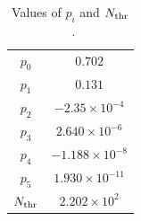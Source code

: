 \begin{table}[H]
	\centering
	\caption[Values of $p_{i}$ and $N_{\rm thr}$]{
	Values of $p_{i}$ and $N_{\rm thr}$~\cite{2023HaradaPhD}.
	}\label{tab:Recons_Neff}
	\vs
	\begin{tabular}{cc} \hline \hline
		$p_{0}$       & $0.702$                 \\
		$p_{1}$       & $0.131$                 \\
		$p_{2}$       & $-2.35 \times 10^{-4}$  \\
		$p_{3}$       & $2.640 \times 10^{-6}$  \\
		$p_{4}$       & $-1.188 \times 10^{-8}$ \\
		$p_{5}$       & $1.930 \times 10^{-11}$ \\
		$N_{\rm thr}$ & $2.202 \times 10^{2}$   \\ \hline \hline
	\end{tabular}
\end{table}





\newpage

